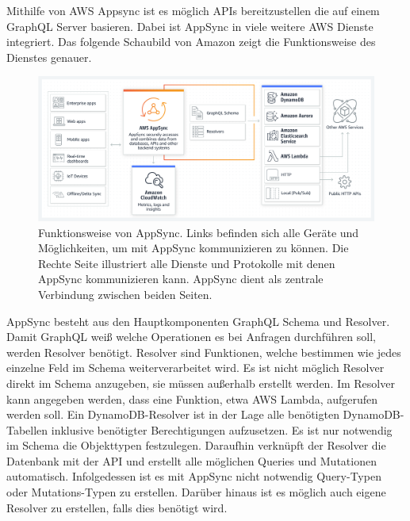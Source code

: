 Mithilfe von AWS Appsync ist es möglich APIs bereitzustellen die auf einem GraphQL Server basieren.
Dabei ist AppSync in viele weitere AWS Dienste integriert.
Das folgende Schaubild von Amazon zeigt die Funktionsweise des Dienstes genauer.
\begin{figure}[htbp]
    \centering
    \includegraphics[width=1.0\textwidth]{40-AWS/Appsync.png}
    \caption{Funktionsweise von AppSync. Links befinden sich alle Geräte und Möglichkeiten, um mit AppSync kommunizieren zu können. Die Rechte Seite illustriert alle Dienste und Protokolle mit denen AppSync kommunizieren kann. AppSync dient als zentrale Verbindung zwischen beiden Seiten. \cite{AppSync}}
    \label{fig:meine-grafik}
\end{figure}
\clearpage
\label{GraphQLResolver}
AppSync besteht aus den Hauptkomponenten GraphQL Schema und Resolver.
Damit GraphQL weiß welche Operationen es bei Anfragen durchführen soll, werden Resolver benötigt.
Resolver sind Funktionen, welche bestimmen wie jedes einzelne Feld im Schema weiterverarbeitet wird.
Es ist nicht möglich Resolver direkt im Schema anzugeben, sie müssen außerhalb erstellt werden.
Im Resolver kann angegeben werden, dass eine Funktion, etwa AWS Lambda, aufgerufen werden soll.
Ein DynamoDB-Resolver ist in der Lage alle benötigten DynamoDB-Tabellen inklusive benötigter Berechtigungen aufzusetzen.
Es ist nur notwendig im Schema die Objekttypen festzulegen.
Daraufhin verknüpft der Resolver die Datenbank mit der API und erstellt alle möglichen Queries und Mutationen automatisch.
Infolgedessen ist es mit AppSync nicht notwendig Query-Typen oder Mutations-Typen zu erstellen.
Darüber hinaus ist es möglich auch eigene Resolver zu erstellen, falls dies benötigt wird.

